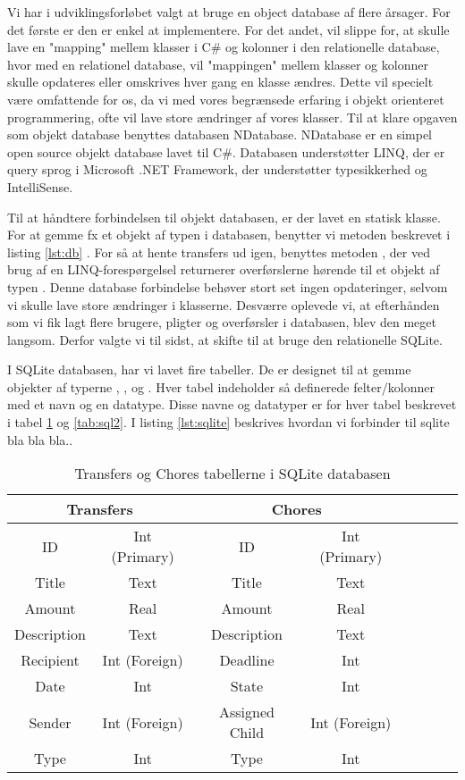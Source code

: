 Vi har i udviklingsforløbet valgt at bruge en object database af flere årsager. For det første er den er enkel at implementere. For det andet, vil slippe for, at skulle lave en "mapping" mellem klasser i C\# og kolonner i den relationelle database, hvor med en relationel database, vil "mappingen" mellem klasser og kolonner skulle opdateres eller omskrives hver gang en klasse ændres. Dette vil specielt være omfattende for os, da vi med vores begrænsede erfaring i objekt orienteret programmering, ofte vil lave store ændringer af vores klasser.
Til at klare opgaven som objekt database benyttes databasen NDatabase. NDatabase er en simpel open source objekt database lavet til C\#. Databasen understøtter LINQ, der er query sprog i Microsoft .NET Framework, der understøtter typesikkerhed og IntelliSense\cite{linqdok}.

Til at håndtere forbindelsen til objekt databasen, er der lavet en statisk klasse. For at gemme fx et objekt af typen  i databasen, benytter vi  metoden beskrevet i listing \ref{lst:db} . For så at hente transfers ud igen, benyttes metoden , der ved brug af en LINQ-forespørgelsel returnerer overførslerne hørende til et objekt af typen . Denne database forbindelse behøver stort set ingen opdateringer, selvom vi skulle lave store ændringer i klasserne.
Desværre oplevede vi, at efterhånden som vi fik lagt flere brugere, pligter og overførsler i databasen, blev den meget langsom. Derfor valgte vi til sidst, at skifte til at bruge den relationelle SQLite.

I SQLite databasen, har vi lavet fire tabeller. De er designet til at gemme objekter af typerne , ,  og . Hver tabel indeholder så definerede felter/kolonner med et navn og en datatype. Disse navne og datatyper er for hver tabel beskrevet i tabel \ref{tab:sql1} og \ref{tab:sql2}. 
I listing \ref{lst:sqlite} beskrives hvordan vi forbinder til sqlite bla bla bla..

\begin{table}[H]
\begin{tabular}{||c|c||c|c||c|c||c|c}
\hline 
\multicolumn{2}{||c||}{Transfers} & \multicolumn{2}{c||}{Chores}\\
\hline
ID & Int (Primary) & ID & Int (Primary) \\ 
\hline 
Title & Text & Title & Text \\ 
\hline 
Amount & Real & Amount & Real \\ 
\hline 
Description & Text & Description & Text \\ 
\hline 
Recipient & Int (Foreign) & Deadline & Int \\ 
\hline 
Date & Int & State & Int \\ 
\hline 
Sender & Int (Foreign) & Assigned Child & Int (Foreign) \\ 
\hline 
Type & Int & Type & Int \\ 
\hline 
\end{tabular} 
\caption{Transfers og Chores tabellerne i SQLite databasen}
\label{tab:sql1}
\end{table}

